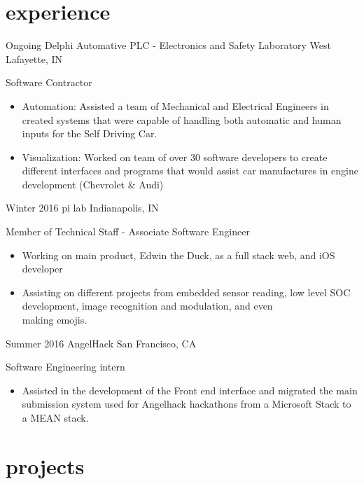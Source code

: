 \documentclass[]{friggeri-cv} %
\begin{document}
\section{experience}
\begin{entrylist}


\entry
{      Ongoing}
{Delphi Automative PLC - \normalfont Electronics and Safety Laboratory}
{West Lafayette, IN}
{Software Contractor
\begin{itemize}
\item Automation: Assisted a team of Mechanical and Electrical Engineers in created systems that were capable of handling both automatic and human inputs for the Self Driving Car.
\item Visualization: Worked on team of over 30 software developers to create different interfaces and programs that would assist car manufactures in engine development (Chevrolet \& Audi)

\end{itemize}}
%
%
%
%
\entry
{      Winter 2016}
{pi lab}
{Indianapolis, IN}
{Member of Technical Staff - Associate Software Engineer
\begin{itemize}
\item Working on main product, Edwin the Duck, as a full stack web, and iOS developer
\item Assisting on different projects from embedded sensor reading, low level SOC development, image recognition and modulation, and even \\ making emojis.
\end{itemize}}
\entry
{Summer 2016}
{AngelHack}
{San Francisco, CA}
{Software Engineering intern
\begin{itemize}
\item Assisted in the development of the Front end interface and migrated the main \\submission system used for Angelhack hackathons from a Microsoft Stack to a MEAN stack.
\end{itemize}}
\end{entrylist}
\vspace{-10pt}

\section{projects}
\end{document}
